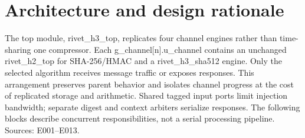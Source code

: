 \documentclass[11pt,a4paper]{article}
\begin{document}
\section{Architecture and design rationale}

The top module,\allowbreak{} rivet\_\allowbreak{}h3\_\allowbreak{}top,\allowbreak{} replicates four channel engines rather than time-sharing one compressor. Each g\_\allowbreak{}channel[\allowbreak{}n]\allowbreak{}.u\_\allowbreak{}channel contains an unchanged rivet\_\allowbreak{}h2\_\allowbreak{}top for SHA-256/\allowbreak{}HMAC and a rivet\_\allowbreak{}h3\_\allowbreak{}sha512 engine. Only the selected algorithm receives message traffic or exposes responses. This arrangement preserves parent behavior and isolates channel progress at the cost of replicated storage and arithmetic. Shared tagged input ports limit injection bandwidth; separate digest and context arbiters serialize responses. The following blocks describe concurrent responsibilities,\allowbreak{} not a serial processing pipeline. Sources: E001–E013.
\end{document}
